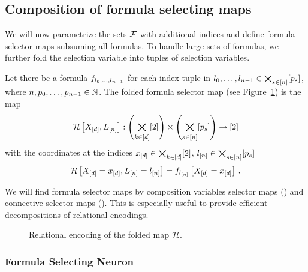 \subsection{Composition of formula selecting maps}

We will now parametrize the sets $\mathcal{F}$ with additional indices and define formula selector maps subsuming all formulas.
To handle large sets of formulas, we further fold the selection variable into tuples of selection variables.

\begin{definition}%
	Let there be a formula $f_{l_{0},\ldots,l_{n-1}}$ for each index tuple in $l_{0},\ldots,l_{n-1}\in\bigtimes_{s\in[n]}[p_{s}]$, where $n,p_{0},\ldots,p_{n-1}\in\mathbb{N}$.
	The folded formula selector map (see Figure~\ref{fig:foldedSelector}) is the map 
		\[ \mathcal{H}\left[X_{[d]},L_{[n]}\right] : \left(\bigtimes_{k\in[d]}[2]\right) \times \left(\bigtimes_{s\in[n]}[p_{s}]\right) \rightarrow [2] \]
	with the coordinates at the indices $x_{[d]}\in\bigtimes_{k\in[d]}[2]$, $l_{[n]}\in\bigtimes_{s\in[n]}[p_{s}]$
		\[  \mathcal{H}\left[X_{[d]}=x_{[d]},L_{[n]}=l_{[n]}\right] 
		= f_{l_{[n]}}\left[X_{[d]}=x_{[d]}\right] \, . \]
\end{definition}

We will find formula selector maps by composition variables selector maps () and connective selector maps ().
This is especially useful to provide efficient decompositions of relational encodings. 

\begin{figure}[h]
\begin{center}
	
\end{center}
\caption{Relational encoding of the folded map $\mathcal{H}$.}
\label{fig:foldedSelector}
\end{figure}




\subsubsection{Formula Selecting Neuron}


